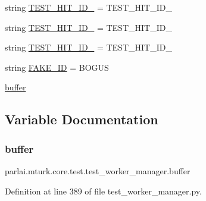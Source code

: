 \begin{DoxyCompactItemize}
\item 
string \hyperlink{namespaceparlai_1_1mturk_1_1core_1_1test_1_1test__worker__manager_aa07a2a09bd27662ffb455dbb966bc8e2}{T\+E\+S\+T\+\_\+\+H\+I\+T\+\_\+\+I\+D\+\_} = \textquotesingle{}T\+E\+S\+T\+\_\+\+H\+I\+T\+\_\+\+I\+D\+\_\textquotesingle{}
\item 
string \hyperlink{namespaceparlai_1_1mturk_1_1core_1_1test_1_1test__worker__manager_a50279f88b18666a80cc54a97054fc987}{T\+E\+S\+T\+\_\+\+H\+I\+T\+\_\+\+I\+D\+\_} = \textquotesingle{}T\+E\+S\+T\+\_\+\+H\+I\+T\+\_\+\+I\+D\+\_\textquotesingle{}
\item 
string \hyperlink{namespaceparlai_1_1mturk_1_1core_1_1test_1_1test__worker__manager_a7f224e1ea861cfcef07ba1a02c70f37e}{T\+E\+S\+T\+\_\+\+H\+I\+T\+\_\+\+I\+D\+\_} = \textquotesingle{}T\+E\+S\+T\+\_\+\+H\+I\+T\+\_\+\+I\+D\+\_\textquotesingle{}
\item 
string \hyperlink{namespaceparlai_1_1mturk_1_1core_1_1test_1_1test__worker__manager_abf9c05d5c28175547d571e1ecfa2080e}{F\+A\+K\+E\+\_\+\+ID} = \textquotesingle{}B\+O\+G\+US\textquotesingle{}
\item 
\hyperlink{namespaceparlai_1_1mturk_1_1core_1_1test_1_1test__worker__manager_aa2d2db0721edca93ac16c579527c4df6}{buffer}
\end{DoxyCompactItemize}


\subsection{Variable Documentation}
\mbox{\label{namespaceparlai_1_1mturk_1_1core_1_1test_1_1test__worker__manager_aa2d2db0721edca93ac16c579527c4df6}} 
\subsubsection{\texorpdfstring{buffer}{buffer}}
{\footnotesize\ttfamily parlai.\+mturk.\+core.\+test.\+test\+\_\+worker\+\_\+manager.\+buffer}



Definition at line 389 of file test\+\_\+worker\+\_\+manager.\+py.

